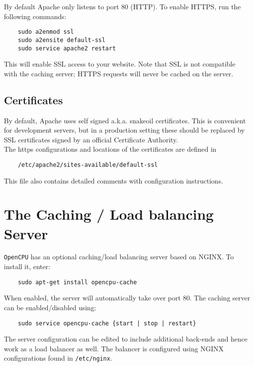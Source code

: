 \documentclass{scrartcl}
\begin{document}
By default Apache only listens to port 80 (HTTP). To enable HTTPS, run the
following commands:

\begin{verbatim}
    sudo a2enmod ssl
    sudo a2ensite default-ssl
    sudo service apache2 restart
\end{verbatim}
This will enable SSL access to your website. Note that SSL is not compatible
with the caching server; HTTPS requests will never be cached on the server.

\subsection{Certificates}
By default, Apache uses self signed a.k.a. snakeoil certificates. This is
convenient for development servers, but in a production setting these should be
replaced by SSL certificates signed by an official Certificate Authority. \\

\noindent The https configurations and locations of the certificates are defined
in

\begin{verbatim}
    /etc/apache2/sites-available/default-ssl
\end{verbatim}
This file also contains detailed comments with configuration instructions.

\section{The Caching / Load balancing Server}

\texttt{OpenCPU} has an optional caching/load balancing server based on NGINX.
To install it, enter:

\begin{verbatim}
    sudo apt-get install opencpu-cache
\end{verbatim}
When enabled, the server will automatically take over port 80. The caching
server can be enabled/disabled using:

\begin{verbatim}
    sudo service opencpu-cache {start | stop | restart}
\end{verbatim}
The server configuration can be edited to include additional back-ends and hence
work as a load balancer as well. The balancer is configured using NGINX
configurations found in \texttt{/etc/nginx}.
\end{document}
